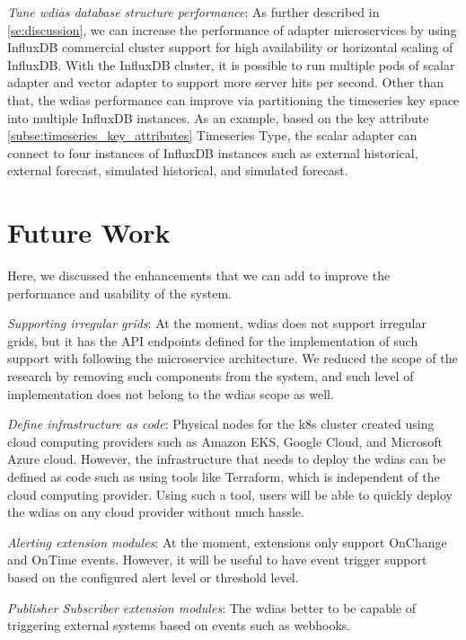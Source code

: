 \emph{Tune \acrshort{wdias} database structure performance}:
As further described in \cref{se:discussion}, we can increase the performance of adapter microservices by using InfluxDB commercial cluster support for high availability or horizontal scaling of InfluxDB. With the InfluxDB cluster, it is possible to run multiple pods of scalar adapter and vector adapter to support more server hits per second. Other than that, the \acrshort{wdias} performance can improve via partitioning the timeseries key space into multiple InfluxDB instances. As an example, based on the key attribute \cref{subse:timeseries_key_attributes} Timeseries Type, the scalar adapter can connect to four instances of InfluxDB instances such as external historical, external forecast, simulated historical, and simulated forecast.

\section{Future Work}
\label{se:future_work}
Here, we discussed the enhancements that we can add to improve the performance and usability of the system.

\emph{Supporting irregular grids}:
At the moment, \acrshort{wdias} does not support irregular grids, but it has the API endpoints defined for the implementation of such support with following the microservice architecture. We reduced the scope of the research by removing such components from the system, and such level of implementation does not belong to the \acrshort{wdias} scope as well.

\emph{Define infrastructure as code}:
Physical nodes for the \acrshort{k8s} cluster created using cloud computing providers such as Amazon EKS, Google Cloud, and Microsoft Azure cloud. However, the infrastructure that needs to deploy the \acrshort{wdias} can be defined as code such as using tools like Terraform, which is independent of the cloud computing provider. Using such a tool, users will be able to quickly deploy the \acrshort{wdias} on any cloud provider without much hassle.

\emph{Alerting extension modules}: At the moment, extensions only support OnChange and OnTime events. However, it will be useful to have event trigger support based on the configured alert level or threshold level. 

\emph{Publisher Subscriber extension modules}: The \acrshort{wdias} better to be capable of triggering external systems based on events such as webhooks.
